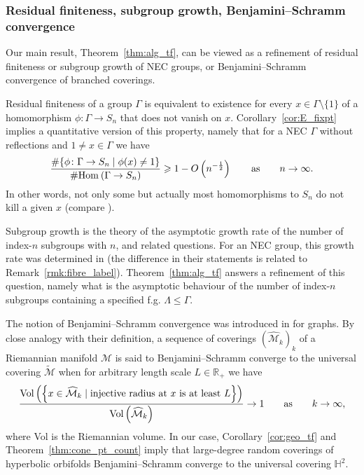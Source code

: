 \documentclass{amsart}
\newcommand{\Hom}[3][]{\tn{Hom}_{#1}\left(#2\to #3\right)}
\newcommand{\tn}{\textnormal}
\begin{document}
\subsubsection{Residual finiteness, subgroup growth, Benjamini--Schramm convergence}

Our main result, Theorem~\ref{thm:alg_tf}, can be viewed as a refinement of residual finiteness or subgroup growth of NEC groups, or Benjamini--Schramm convergence of branched coverings.

Residual finiteness of a group $\Gamma$ is equivalent to existence for every $x\in\Gamma\setminus\{1\}$ of a homomorphism $\phi\colon\Gamma\to S_n$ that does not vanish on $x$. Corollary~\ref{cor:E_fixpt} implies a quantitative version of this property, namely that for a NEC $\Gamma$ without reflections and $1\neq x\in\Gamma$ we have
\begin{equation*}
\frac{\#\{\phi\colon\Gamma\to S_n\mid\phi(x)\neq1\}}{\#\Hom{\Gamma}{S_n}}\geqslant1-O\left(n^{-\frac{1}{2}}\right)\qquad\text{as}\qquad n\to\infty.
\end{equation*}
In other words, not only some but actually most homomorphisms to $S_n$ do not kill a given $x$ (compare \cite[Corollary 1.5]{asymptotic_stats_random_covering_surfaces_MageePuder23}).

Subgroup growth is the theory of the asymptotic growth rate of the number of index-$n$ subgroups with $n$, and related questions. For an NEC group, this growth rate was determined in \cites[Theorem A]{char_theory_symm_gps_subgp_growth_fuchsian_gps_random_walks_MuellerSchlagePuchta07}[Theorem 1.12(i)]{fuchsian_gps_coverings_Riemann_surfaces_subgp_growth_random_quots_walks_LiebeckShalev04} (the difference in their statements is related to Remark~\ref{rmk:fibre_label}). Theorem~\ref{thm:alg_tf} answers a refinement of this question, namely what is the asymptotic behaviour of the number of index-$n$ subgroups containing a specified f.g. $\Lambda\leq\Gamma$.

The notion of Benjamini--Schramm convergence was introduced in \cite{recurrence_distributions_limits_finite_planar_graphs_BenjaminiSchramm01} for graphs. By close analogy with their definition, a sequence of coverings $(\widehat{\mathcal{M}}_k)_k$ of a Riemannian manifold $\mathcal{M}$ is said to Benjamini--Schramm converge to the universal covering $\widetilde{\mathcal{M}}$ when for arbitrary length scale $L\in\mathbb{R}_+$ we have
\begin{equation*}
\frac{\tn{Vol}\left(\left\{x\in\widehat{\mathcal{M}}_k\mid\text{injective radius at }x\text{ is at least }L\right\}\right)}{\tn{Vol}\left(\widehat{\mathcal{M}}_k\right)}\to1\qquad\text{as}\qquad k\to\infty,
\end{equation*}
where Vol is the Riemannian volume. In our case, Corollary~\ref{cor:geo_tf} and Theorem~\ref{thm:cone_pt_count} imply that large-degree random coverings of hyperbolic orbifolds Benjamini--Schramm converge to the universal covering $\mathbb{H}^2$.
\end{document}
